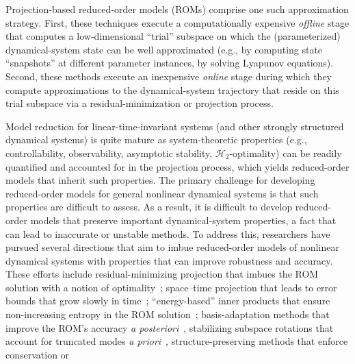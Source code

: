 \documentclass[3p,computermodern,10pt]{elsarticle}
\begin{document}

Projection-based reduced-order models (ROMs) comprise one such approximation
strategy. First, these techniques execute a computationally expensive
\textit{offline} stage that computes a low-dimensional ``trial'' subspace on
which the (parameterized) dynamical-system state can be well approximated
(e.g., by computing state ``snapshots'' at different parameter instances, by
solving Lyapunov equations). Second, these methods execute an inexpensive
\textit{online} stage during which they compute approximations to the
dynamical-system trajectory that reside on this trial subspace via a
residual-minimization or projection process.
 
Model reduction for linear-time-invariant systems (and other strongly
structured dynamical systems) is quite mature \cite{wilcox_benner_rev,moore,roberts,GugercinIRKA} as system-theoretic properties (e.g., controllability,
observability, asymptotic stability, $\mathcal H_2$-optimality) can be readily
quantified and accounted for in the projection process, which yields
reduced-order models that inherit such properties.  The primary challenge for
developing reduced-order models for general nonlinear dynamical systems is
that such properties are difficult to assess. As a result, it
is difficult to develop reduced-order models that preserve important
dynamical-system properties, a fact that can lead to inaccurate or unstable methods.  To address this, researchers have
pursued several directions that aim to imbue reduced-order models of nonlinear
dynamical systems with properties that can improve robustness and accuracy.
These
efforts include residual-minimizing
projection that imbues the ROM solution with a notion of optimality~\cite{l1,carlberg_lspg,carlberg_gnat,legresley_1,legresley_2,legresley_3,bui_resmin_steady,bui_unsteady,rovas_thesis,carlberg_thesis,bui_thesis};
space--time
projection that leads to error bounds that grow slowly in time~\cite{choi_stlspg,constantine_strom,URBAN2012203,Yano2014ASC,benner_st};
``energy-based'' inner
products that ensure non-increasing entropy in the ROM solution~\cite{rowley_pod_energyproj,Kalashnikova_sand2014};
basis-adaptation methods that improve the ROM's accuracy \textit{a posteriori}~\cite{carlberg_hadaptation,adeim_peherstorfer}, stabilizing subspace rotations that account for truncated modes \textit{a priori}~\cite{basis_rotation}, structure-preserving
methods that enforce conservation \cite{carlberg_conservative_rom} or
\end{document}
